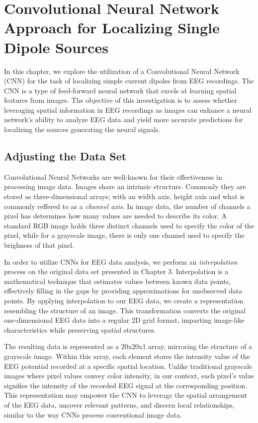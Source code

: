 \documentclass[a4paper, UKenglish, 11pt]{uiomaster}
\begin{document}
\chapter{Convolutional Neural Network Approach for Localizing Single Dipole Sources} \label{chap:simple_dipole_CNN}
In this chapter, we explore the utilization of a Convolutional Neural Network (CNN) for the task of localizing simple current dipoles from EEG recordings. The CNN is a type of feed-forward neural network that excels at learning spatial features from images. The objective of this investigation is to assess whether leveraging spatial information in EEG recordings as images can enhance a neural network's ability to analyze EEG data and yield more accurate predictions for localizing the sources generating the neural signals.

\section{Adjusting the Data Set}
Convolutional Neural Networks are well-known for their effectiveness in processing image data. Images share an intrinsic structure. Commonly they are stored as three-dimensional arrays; with an width axis, height axis and what is commonly reffered to as a \emph{channel axis}. In image data, the number of channels a pixel has determines how many values are needed to describe its color. A standard RGB image holds three distinct channels used to specify the color of the pixel, while for a grayscale image, there is only one channel used to specify the brighness of that pixel.

In order to utilize CNNs for EEG data analysis, we perform an \emph{interpolation} process on the original data set presented in Chapter 3. Interpolation is a mathematical technique that estimates values between known data points, effectively filling in the gaps by providing approximations for unobserved data points. By applying interpolation to our EEG data, we create a representation resembling the structure of an image. This transformation converts the original one-dimensional EEG data into a regular 2D grid format, imparting image-like characteristics while preserving spatial structures.

The resulting data is represented as a 20x20x1 array, mirroring the structure of a grayscale image. Within this array, each element stores the intensity value of the EEG potential recorded at a specific spatial location. Unlike traditional grayscale images where pixel values convey color intensity, in our context, each pixel's value signifies the intensity of the recorded EEG signal at the corresponding position. This representation may empower the CNN to leverage the spatial arrangement of the EEG data, uncover relevant patterns, and discern local relationships, similar to the way CNNs process conventional image data.
\end{document}
